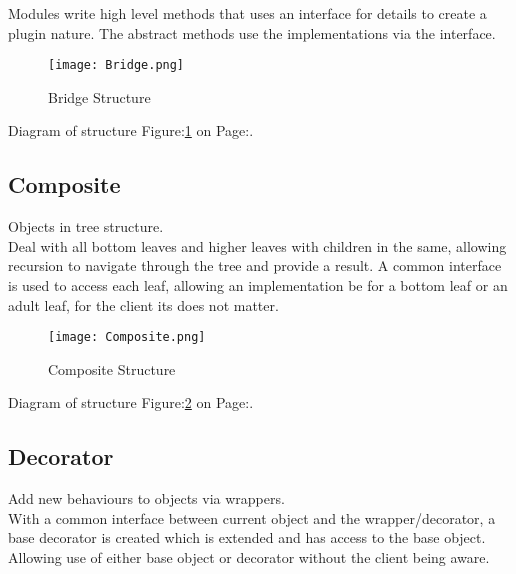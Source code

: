 \documentclass[11pt]{scrartcl} %
\begin{document}
Modules write high level methods that uses an interface for details to create a plugin nature. The 
abstract methods use the implementations via the interface.\\

\begin{figure}[h] %
	\centering
	\texttt{[image: Bridge.png]} %
	\caption{Bridge Structure}
	\label{Bridge Structure}
\end{figure}

Diagram of structure Figure:\ref{Bridge Structure} on Page:\pageref{Bridge Structure}.

\subsection{Composite}

Objects in tree structure.\\

Deal with all bottom leaves and higher leaves with children in the same, allowing recursion to navigate through
the tree and provide a result. A common interface is used to access each leaf, allowing an implementation be for a 
bottom leaf or an adult leaf, for the client its does not matter.\\

\begin{figure}[h] %
	\centering
	\texttt{[image: Composite.png]} %
	\caption{Composite Structure}
	\label{Composite Structure}
\end{figure}

Diagram of structure Figure:\ref{Composite Structure} on Page:\pageref{Composite Structure}.

\subsection{Decorator}

Add new behaviours to objects via wrappers.\\

With a common interface between current object and the wrapper/decorator, a
base decorator is created which is extended and has access to the base object. Allowing use of either
base object or decorator without the client being aware.\\
\end{document}
